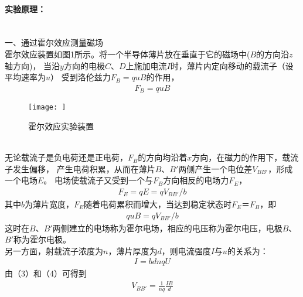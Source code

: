 \documentclass[UTF8]{ctexart}
\begin{document}
\paragraph*{实验原理：}~\\
一、通过霍尔效应测量磁场~\\
\indent 霍尔效应装置如图1所示。将一个半导体薄片放在垂直于它的磁场中($B$的方向沿$z$轴方向)，
当沿$y$方向的电极$C$、$D$上施加电流$I$时，薄片内定向移动的载流子（设平均速率为$u$）
受到洛伦兹力$F_{B}=quB$的作用，
\begin{equation}
    \begin{split}
        F_{B}=quB     
    \end{split}
\end{equation}
\begin{figure}[H]
    \centering
    \texttt{[image: ]}
    \caption{霍尔效应实验装置}
 \end{figure}~\\
无论载流子是负电荷还是正电荷，$F_{B}$的方向均沿着$x$方向，在磁力的作用下，载流子发生偏移，
产生电荷积累，从而在薄片$B$、$B'$两侧产生一个电位差$V_{BB'}$，形成一个电场$E$。
电场使载流子又受到一个与$F_{B}$方向相反的电场力$F_{E}$，
\begin{equation}
    \begin{split}
        F_{E}=qE=qV_{BB'}/b     
    \end{split}
\end{equation}
其中$b$为薄片宽度，$F_{E}$随着电荷累积而增大，当达到稳定状态时$F_{E}$＝$F_{B}$，即
\begin{equation}
    \begin{split}
        quB=qV_{BB'}/b     
    \end{split}
\end{equation}			
这时在$B$、$B'$两侧建立的电场称为霍尔电场，相应的电压称为霍尔电压，电极$B$、$B'$称为霍尔电极。~\\
\indent 另一方面，射载流子浓度为$n$，薄片厚度为$d$，则电流强度$I$与$u$的关系为：
\begin{equation}
    \begin{split}
        I=bdnqU     
    \end{split}
\end{equation} 	                
由（3）和（4）可得到
\begin{equation}
    \begin{split}
        V_{BB'}=\frac{1}{nq}\frac{IB}{d}     
    \end{split}
\end{equation}
\end{document}
